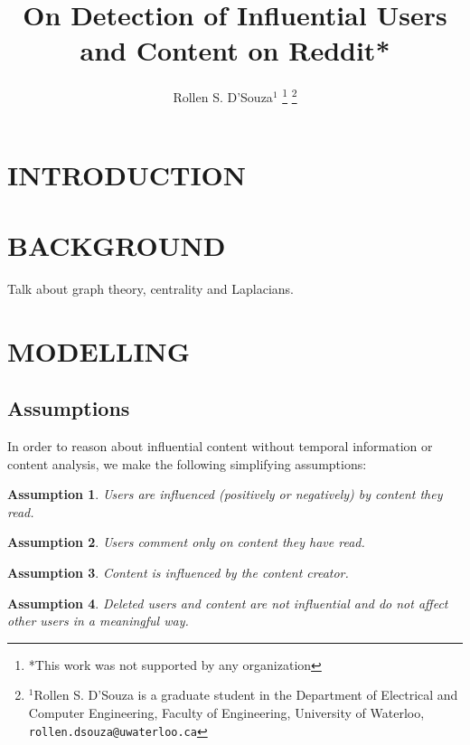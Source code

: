 \documentclass[letterpaper, 10 pt, conference]{ieeeconf}
\title{\LARGE \bf
On Detection of Influential Users and Content on Reddit*
}
\author{Rollen S. D'Souza$^{1}$%
  \thanks{*This work was not supported by any organization}%
  \thanks{$^{1}$Rollen S. D'Souza is a graduate student in the
    Department of Electrical and Computer Engineering,
    Faculty of Engineering,
    University of Waterloo,
    \texttt{rollen.dsouza@uwaterloo.ca}
  }%
}
\theoremstyle{plain}
\newtheorem{assumption}{Assumption}[section]
\newcommand{\red}{\color{red}}
\begin{document}
\maketitle
\thispagestyle{empty}
\pagestyle{empty}


\begin{abstract}


\end{abstract}


\section{INTRODUCTION}


\section{BACKGROUND}
{\red Talk about graph theory, centrality and Laplacians.}

\section{MODELLING}

\subsection{Assumptions}
In order to reason about influential content without temporal information or content analysis, we make the following simplifying assumptions:

\begin{assumption}
  Users are influenced (positively or negatively) by content they read.
  \label{assume:1}
\end{assumption} 

\begin{assumption}
  Users comment only on content they have read.
  \label{assume:2}
\end{assumption}

\begin{assumption}
  Content is influenced by the content creator.
  \label{assume:3}
\end{assumption}

\begin{assumption}
  Deleted users and content are not influential and do not affect other users in a meaningful way.
  \label{assume:4}
\end{assumption}
\end{document}
